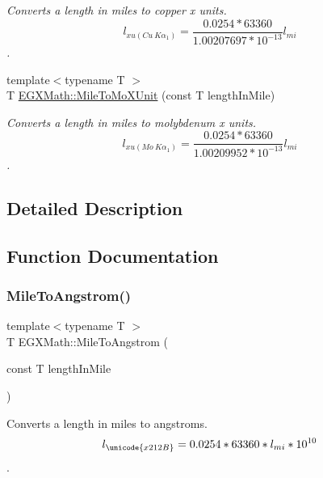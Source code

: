 \begin{DoxyCompactItemize}
\begin{DoxyCompactList}\small\item\em Converts a length in miles to copper x units. \[ l_{xu(Cu\ K\alpha_1)}=\frac{0.0254 * 63360}{1.00207697*10^{-13}} l_{mi}\]. \end{DoxyCompactList}\item 
{\footnotesize template$<$typename T $>$ }\\T \mbox{\hyperlink{group___e_g_x_math-_conversions-_length_conversions-_imperial-_mile-_non-_s_i_gadefb09bf42157adb9c7a458b93e3a851}{E\+G\+X\+Math\+::\+Mile\+To\+Mo\+X\+Unit}} (const T length\+In\+Mile)
\begin{DoxyCompactList}\small\item\em Converts a length in miles to molybdenum x units. \[ l_{xu(Mo\ K\alpha_1)}=\frac{0.0254 * 63360}{1.00209952*10^{-13}} l_{mi}\]. \end{DoxyCompactList}\end{DoxyCompactItemize}


\subsection{Detailed Description}


\subsection{Function Documentation}
\mbox{\label{group___e_g_x_math-_conversions-_length_conversions-_imperial-_mile-_non-_s_i_ga291d6035f59be619459011941676f7c7}} 
\subsubsection{\texorpdfstring{Mile\+To\+Angstrom()}{MileToAngstrom()}}
{\footnotesize\ttfamily template$<$typename T $>$ \\
T E\+G\+X\+Math\+::\+Mile\+To\+Angstrom (\begin{DoxyParamCaption}\item[{const T}]{length\+In\+Mile }\end{DoxyParamCaption})}



Converts a length in miles to angstroms. \[ l_{\unicode{x212B}}=0.0254 * 63360 * l_{mi} * 10^{10} \]. 

